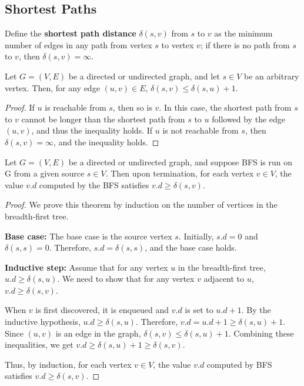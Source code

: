 \newpage

\subsection*{Shortest Paths}

\begin{definitionblock}
    Define the \textbf{shortest path distance} $\delta(s,v)$ from $s$ to $v$ as the minimum number of edges in any path from vertex $s$ to vertex $v$; if there is no path from $s$ to $v$, then $\delta(s,v) = \infty$.
\end{definitionblock}

\newtheorem{shortest path}{Lemma}
\begin{theorem}
    Let $G = (V, E)$ be a directed or undirected graph, and let $s \in V$ be an arbitrary
    vertex. Then, for any edge $(u, v) \in E$, $\delta(s, v) \leq \delta(s, u) + 1$.
\end{theorem}

\begin{proof}
    If $u$ is reachable from $s$, then so is $v$. In this case, the shortest path from $s$
    to $v$ cannot be longer than the shortest path from $s$ to $u$ followed by the edge $(u,v)$,
    and thus the inequality holds. If $u$ is not reachable from $s$, then $\delta(s,v) = \infty$, and
    the inequality holds.
\end{proof}

\newtheorem{shortest path 2}{Lemma}
\begin{theorem}
    Let $G = (V, E)$ be a directed or undirected graph, and suppose BFS is run on G
    from a given source $s \in V$. Then upon termination, for each vertex $v \in V$, 
    the value $v.d$ computed by the BFS satisfies $v.d \geq \delta(s, v)$.
\end{theorem}
\begin{proof}
    We prove this theorem by induction on the number of vertices in the breadth-first tree.

    \textbf{Base case:} The base case is the source vertex $s$. Initially, $s.d = 0$ and $\delta(s, s) = 0$. Therefore, $s.d = \delta(s, s)$, and the base case holds.

    \textbf{Inductive step:} Assume that for any vertex $u$ in the breadth-first tree, $u.d \geq \delta(s, u)$. We need to show that for any vertex $v$ adjacent to $u$, $v.d \geq \delta(s, v)$.

    When $v$ is first discovered, it is enqueued and $v.d$ is set to $u.d + 1$. By the inductive hypothesis, $u.d \geq \delta(s, u)$. Therefore, $v.d = u.d + 1 \geq \delta(s, u) + 1$. Since $(u, v)$ is an edge in the graph, $\delta(s, v) \leq \delta(s, u) + 1$. Combining these inequalities, we get $v.d \geq \delta(s, u) + 1 \geq \delta(s, v)$.

    Thus, by induction, for each vertex $v \in V$, the value $v.d$ computed by BFS satisfies $v.d \geq \delta(s, v)$.
\end{proof}

